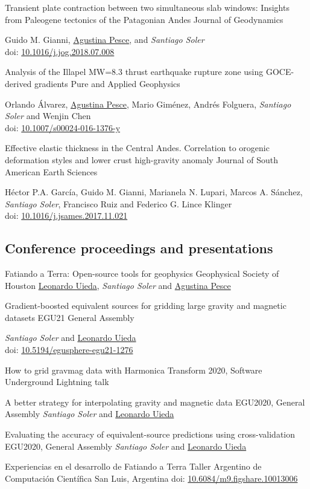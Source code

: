 \documentclass[a4paper,12pt,sans]{moderncv/moderncv}
\newcommand{\me}{\emph{Santiago Soler}}
\newcommand{\agustina}{\href{https://aguspesce.github.io}{Agustina Pesce}}
\newcommand{\guido}{Guido M. Gianni}
\newcommand{\leo}{\href{https://www.leouieda.com}{Leonardo Uieda}}
\newcommand{\mario}{Mario Giménez}
\newcommand{\orlando}{Orlando Álvarez}
\newcommand{\folguera}{Andrés Folguera}
\newcommand{\wenjinchen}{Wenjin Chen}
\newcommand{\pichu}{Héctor P.A. García}
\newcommand{\mae}{Marianela N. Lupari}
\newcommand{\marcos}{Marcos A. Sánchez}
\newcommand{\paco}{Francisco Ruiz}
\newcommand{\fede}{Federico G. Lince Klinger}
\newcommand{\doi}[1]{
    \href{https://doi.org/#1}{#1}
}
\begin{document}
{
    Transient plate contraction between two simultaneous slab windows:
    Insights from Paleogene tectonics of the Patagonian Andes
}
{Journal of Geodynamics}
{}
{}
{
    \guido{}, \agustina{}, and \me{}
    \\
    doi: \doi{10.1016/j.jog.2018.07.008}
}

{
    Analysis of the Illapel MW=8.3 thrust earthquake rupture zone using
    GOCE-derived gradients
}
{Pure and Applied Geophysics}
{}
{}
{
    \orlando{}, \agustina{}, \mario{}, \folguera{}, \me{} and \wenjinchen{}
    \\
    doi: \doi{10.1007/s00024-016-1376-y}
}

{
    Effective elastic thickness in the Central Andes.
    Correlation to orogenic deformation styles and lower crust high-gravity
    anomaly
}
{Journal of South American Earth Sciences}
{}
{}
{
    \pichu{}, \guido{}, \mae{}, \marcos{}, \me{}, \paco{} and \fede{}
    \\
    doi: \doi{10.1016/j.jsames.2017.11.021}
}


\newpage
\subsection{Conference proceedings and presentations}

{Fatiando a Terra: Open-source tools for geophysics}
{Geophysical Society of Houston}
{}
{}
{\leo{}, \me{} and \agustina{}}

{
    Gradient-boosted equivalent sources for gridding large gravity and
    magnetic datasets
}
{EGU21 General Assembly}
{}
{}
{
    \me{} and \leo{}
    \\
    doi: \doi{10.5194/egusphere-egu21-1276}
}

{How to grid gravmag data with Harmonica}
{Transform 2020, Software Underground}
{}
{Lightning talk}
{}

{A better strategy for interpolating gravity and magnetic data}
{EGU2020, General Assembly}
{}
{}
{\me{} and \leo{}}

{
    Evaluating the accuracy of equivalent-source predictions using
    cross-validation
}
{EGU2020, General Assembly}
{}
{}
{\me{} and \leo{}}

{Experiencias en el desarrollo de Fatiando a Terra}
{Taller Argentino de Computación Científica}
{San Luis, Argentina}
{}
{doi: \doi{10.6084/m9.figshare.10013006}}
\end{document}
